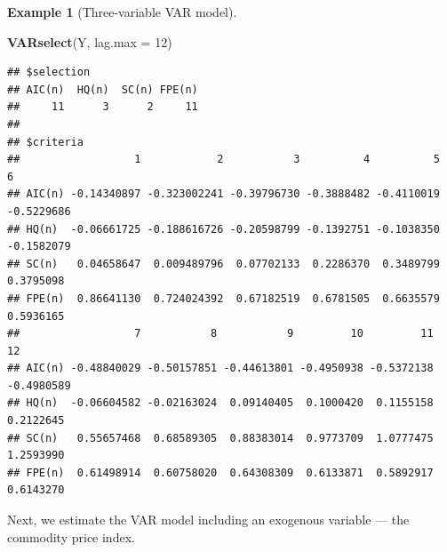 \documentclass[
  11pt,
]{book}
\newenvironment{Shaded}{\begin{snugshade}}{\end{snugshade}}
\newcommand{\AttributeTok}[1]{\textcolor[rgb]{0.13,0.29,0.53}{#1}}
\newcommand{\CommentTok}[1]{\textcolor[rgb]{0.56,0.35,0.01}{\textit{#1}}}
\newcommand{\DecValTok}[1]{\textcolor[rgb]{0.00,0.00,0.81}{#1}}
\newcommand{\FunctionTok}[1]{\textcolor[rgb]{0.13,0.29,0.53}{\textbf{#1}}}
\newcommand{\NormalTok}[1]{#1}
\newcommand{\OtherTok}[1]{\textcolor[rgb]{0.56,0.35,0.01}{#1}}
\newcommand{\SpecialCharTok}[1]{\textcolor[rgb]{0.81,0.36,0.00}{\textbf{#1}}}
\newcommand{\StringTok}[1]{\textcolor[rgb]{0.31,0.60,0.02}{#1}}
\theoremstyle{definition}
\theoremstyle{definition}
\newtheorem{example}{Example}[chapter]
\theoremstyle{definition}
\theoremstyle{definition}
\theoremstyle{remark}
\begin{document}
\begin{example}[Three-variable VAR model]
\begin{Shaded}
\begin{Highlighting}[]
\FunctionTok{VARselect}\NormalTok{(Y, }\AttributeTok{lag.max =} \DecValTok{12}\NormalTok{)}
\end{Highlighting}
\end{Shaded}

\begin{verbatim}
## $selection
## AIC(n)  HQ(n)  SC(n) FPE(n) 
##     11      3      2     11 
## 
## $criteria
##                  1            2           3          4          5          6
## AIC(n) -0.14340897 -0.323002241 -0.39796730 -0.3888482 -0.4110019 -0.5229686
## HQ(n)  -0.06661725 -0.188616726 -0.20598799 -0.1392751 -0.1038350 -0.1582079
## SC(n)   0.04658647  0.009489796  0.07702133  0.2286370  0.3489799  0.3795098
## FPE(n)  0.86641130  0.724024392  0.67182519  0.6781505  0.6635579  0.5936165
##                  7           8           9         10         11         12
## AIC(n) -0.48840029 -0.50157851 -0.44613801 -0.4950938 -0.5372138 -0.4980589
## HQ(n)  -0.06604582 -0.02163024  0.09140405  0.1000420  0.1155158  0.2122645
## SC(n)   0.55657468  0.68589305  0.88383014  0.9773709  1.0777475  1.2593990
## FPE(n)  0.61498914  0.60758020  0.64308309  0.6133871  0.5892917  0.6143270
\end{verbatim}

Next, we estimate the VAR model including an exogenous variable --- the commodity price index.

\begin{Shaded}
\end{Shaded}


\end{example}
\end{document}

